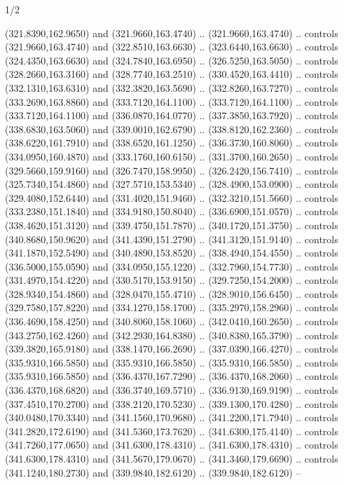 \begin{flagdescription}{1/2}
\begin{scope}[xshift=0.5\flaglength]
\begin{scope}[scale=0.004\flagwidth,xshift=-90mm,yshift=89mm]
\begin{scope}[y=0.80pt, x=0.80pt, yscale=-1, xscale=1, inner sep=0pt, outer sep=0pt]
  (321.8390,162.9650) and (321.9660,163.4740) .. (321.9660,163.4740) .. controls
  (321.9660,163.4740) and (322.8510,163.6630) .. (323.6440,163.6630) .. controls
  (324.4350,163.6630) and (324.7840,163.6950) .. (326.5250,163.5050) .. controls
  (328.2660,163.3160) and (328.7740,163.2510) .. (330.4520,163.4410) .. controls
  (332.1310,163.6310) and (332.3820,163.5690) .. (332.8260,163.7270) .. controls
  (333.2690,163.8860) and (333.7120,164.1100) .. (333.7120,164.1100) .. controls
  (333.7120,164.1100) and (336.0870,164.0770) .. (337.3850,163.7920) .. controls
  (338.6830,163.5060) and (339.0010,162.6790) .. (338.8120,162.2360) .. controls
  (338.6220,161.7910) and (338.6520,161.1250) .. (336.3730,160.8060) .. controls
  (334.0950,160.4870) and (333.1760,160.6150) .. (331.3700,160.2650) .. controls
  (329.5660,159.9160) and (326.7470,158.9950) .. (326.2420,156.7410) .. controls
  (325.7340,154.4860) and (327.5710,153.5340) .. (328.4900,153.0900) .. controls
  (329.4080,152.6440) and (331.4020,151.9460) .. (332.3210,151.5660) .. controls
  (333.2380,151.1840) and (334.9180,150.8040) .. (336.6900,151.0570) .. controls
  (338.4620,151.3120) and (339.4750,151.7870) .. (340.1720,151.3750) .. controls
  (340.8680,150.9620) and (341.4390,151.2790) .. (341.3120,151.9140) .. controls
  (341.1870,152.5490) and (340.4890,153.8520) .. (338.4940,154.4550) .. controls
  (336.5000,155.0590) and (334.0950,155.1220) .. (332.7960,154.7730) .. controls
  (331.4970,154.4220) and (330.5170,153.9150) .. (329.7250,154.2000) .. controls
  (328.9340,154.4860) and (328.0470,155.4710) .. (328.9010,156.6450) .. controls
  (329.7580,157.8220) and (334.1270,158.1700) .. (335.2970,158.2960) .. controls
  (336.4690,158.4250) and (340.8060,158.1060) .. (342.0410,160.2650) .. controls
  (343.2750,162.4260) and (342.2930,164.8380) .. (340.8380,165.3790) .. controls
  (339.3820,165.9180) and (338.1470,166.2690) .. (337.0390,166.4270) .. controls
  (335.9310,166.5850) and (335.9310,166.5850) .. (335.9310,166.5850) .. controls
  (335.9310,166.5850) and (336.4370,167.7290) .. (336.4370,168.2060) .. controls
  (336.4370,168.6820) and (336.3740,169.5710) .. (336.9130,169.9190) .. controls
  (337.4510,170.2700) and (338.2120,170.5230) .. (339.1300,170.4280) .. controls
  (340.0480,170.3340) and (341.1560,170.9680) .. (341.2200,171.7940) .. controls
  (341.2820,172.6190) and (341.5360,173.7620) .. (341.6300,175.4140) .. controls
  (341.7260,177.0650) and (341.6300,178.4310) .. (341.6300,178.4310) .. controls
  (341.6300,178.4310) and (341.5670,179.0670) .. (341.3460,179.6690) .. controls
  (341.1240,180.2730) and (339.9840,182.6120) .. (339.9840,182.6120) --

\end{scope}
\end{scope}
\end{scope}
\end{flagdescription}
